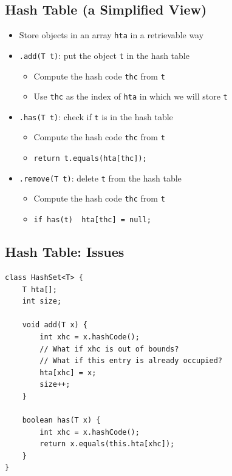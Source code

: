 \documentclass[10pt]{article}
\begin{document}
\subsection*{Hash Table (a Simplified View)}
\begin{itemize}
    \item Store objects in an array \texttt{hta} in a retrievable way
    \item \texttt{.add(T t)}: put the object \texttt{t} in the hash table
    \begin{itemize}
        \item Compute the hash code \texttt{thc} from \texttt{t}
        \item Use \texttt{thc} as the index of \texttt{hta} in which we will store \texttt{t}
    \end{itemize}
    \item \texttt{.has(T t)}: check if \texttt{t} is in the hash table
    \begin{itemize}
        \item Compute the hash code \texttt{thc} from \texttt{t}
        \item \texttt{return t.equals(hta[thc]);}
    \end{itemize}
    \item \texttt{.remove(T t)}: delete \texttt{t} from the hash table
    \begin{itemize}
        \item Compute the hash code \texttt{thc} from \texttt{t}
        \item \texttt{if has(t) { hta[thc] = null;}}
    \end{itemize}
\end{itemize}


\subsection*{Hash Table: Issues}
\begin{verbatim}
class HashSet<T> {
    T hta[];
    int size;

    void add(T x) {
        int xhc = x.hashCode();
        // What if xhc is out of bounds?
        // What if this entry is already occupied?
        hta[xhc] = x;
        size++;
    }

    boolean has(T x) {
        int xhc = x.hashCode();
        return x.equals(this.hta[xhc]);
    }
}
\end{verbatim}
\end{document}
